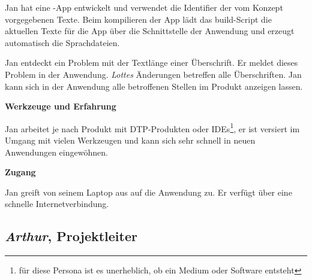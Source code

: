 \begin{multicols}{2}
Jan hat eine -App entwickelt und verwendet die Identifier der vom Konzept vorgegebenen Texte. Beim kompilieren der App lädt das build-Script die aktuellen Texte für die App über die Schnittstelle der Anwendung und erzeugt automatisch die Sprachdateien.

Jan entdeckt ein Problem mit der Textlänge einer Überschrift. Er meldet dieses Problem in der Anwendung. \emph{Lottes} Änderungen betreffen alle Überschriften. Jan kann sich in der Anwendung alle betroffenen Stellen im Produkt anzeigen lassen.

\textbf{Werkzeuge und Erfahrung}

Jan arbeitet je nach Produkt mit DTP-Produkten oder IDEs\footnote{für diese Persona ist es unerheblich, ob ein Medium oder Software entsteht}, er ist versiert im Umgang mit vielen Werkzeugen und kann sich sehr schnell in neuen Anwendungen eingewöhnen.

\textbf{Zugang}

Jan greift von seinem Laptop aus auf die Anwendung zu. Er verfügt über eine schnelle Internetverbindung.

\end{multicols}

\pagebreak

\subsection{\emph{Arthur}, Projektleiter}\label{p:arthur}

